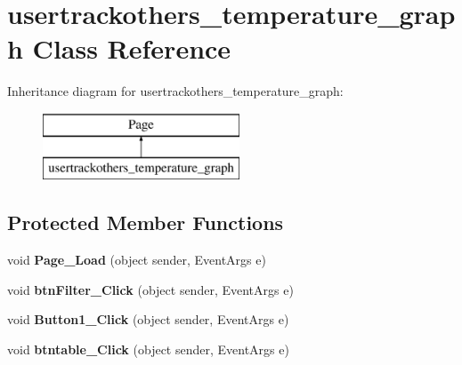 \hypertarget{classusertrackothers__temperature__graph}{\section{usertrackothers\-\_\-temperature\-\_\-graph Class Reference}
\label{classusertrackothers__temperature__graph}
}
Inheritance diagram for usertrackothers\-\_\-temperature\-\_\-graph\-:\begin{figure}[H]
\begin{center}
\leavevmode
\includegraphics[height=2.000000cm]{classusertrackothers__temperature__graph}
\end{center}
\end{figure}
\subsection*{Protected Member Functions}
\begin{DoxyCompactItemize}
\item 
\hypertarget{classusertrackothers__temperature__graph_a784822cecc31d46867fc287ddd737cab}{void {\bfseries Page\-\_\-\-Load} (object sender, Event\-Args e)}\label{classusertrackothers__temperature__graph_a784822cecc31d46867fc287ddd737cab}

\item 
\hypertarget{classusertrackothers__temperature__graph_a048f33e3d7f6d5dbbf5188e419059f7e}{void {\bfseries btn\-Filter\-\_\-\-Click} (object sender, Event\-Args e)}\label{classusertrackothers__temperature__graph_a048f33e3d7f6d5dbbf5188e419059f7e}

\item 
\hypertarget{classusertrackothers__temperature__graph_a01ee61cf99bcb1673a20acf45732dd0d}{void {\bfseries Button1\-\_\-\-Click} (object sender, Event\-Args e)}\label{classusertrackothers__temperature__graph_a01ee61cf99bcb1673a20acf45732dd0d}

\item 
\hypertarget{classusertrackothers__temperature__graph_a8ba724e26a24954bdd44c52cd10e999d}{void {\bfseries btntable\-\_\-\-Click} (object sender, Event\-Args e)}\label{classusertrackothers__temperature__graph_a8ba724e26a24954bdd44c52cd10e999d}

\end{DoxyCompactItemize}


